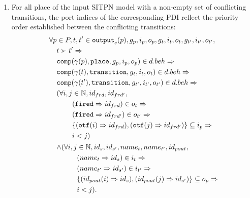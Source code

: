 \begin{definition}
\begin{enumerate}[resume]
  \item For all place of the input SITPN model with a non-empty set of
    conflicting transitions, the port indices of the corresponding PDI
    reflect the priority order established between the conflicting
    transitions:
    \begin{equation*}
      \begin{aligned}[t]
        \forall{}p&\in{}P,t,t'\in{}\mathtt{output}_c(p),g_p,i_p,o_p,g_t,i_t,o_t,g_{t'},i_{t'},o_{t'}, \\
                  & t\succ{}t'\Rightarrow\\
                  & \mathtt{comp}(\gamma(p),\mathtt{place},g_p,i_p,o_p)\in{}d.beh\Rightarrow \\
                  & \mathtt{comp}(\gamma(t),\mathtt{transition},g_{t},i_{t},o_{t})\in{}d.beh\Rightarrow \\
                  & \mathtt{comp}(\gamma(t'),\mathtt{transition},g_{t'},i_{t'},o_{t'})\in{}d.beh\Rightarrow \\
                  &
                    \begin{aligned}[t]
                      (\forall{}i,j&\in\mathbb{N},id_{frd},id_{frd'}, \\
                                   & (\mathtt{fired}\Rightarrow{}id_{frd})\in{}o_t\Rightarrow \\
                                   & (\mathtt{fired}\Rightarrow{}id_{frd'})\in{}o_{t'}\Rightarrow \\
                                   & \{(\mathtt{otf}(i)\Rightarrow{}id_{frd}),(\mathtt{otf}(j)\Rightarrow{}id_{frd'})\}\subseteq{}i_p\Rightarrow \\
                                   & i<j) \\
                    \end{aligned} \\
                  & \begin{aligned}[t]
                      \land(\forall{}i,j&\in\mathbb{N},id_{s},id_{s'},name_t,name_{t'},id_{pout}, \\
                                        & (name_t\Rightarrow{}id_{s})\in{}i_t\Rightarrow \\
                                        & (name_{t'}\Rightarrow{}id_{s'})\in{}i_{t'}\Rightarrow \\
                                        & \{(id_{pout}(i)\Rightarrow{}id_s),(id_{pout}(j)\Rightarrow{}id_{s'})\}\subseteq{}o_p\Rightarrow \\
                                        & i<j). \\
                    \end{aligned} \\
      \end{aligned}
    \end{equation*}
    

\end{enumerate}
\end{definition}
